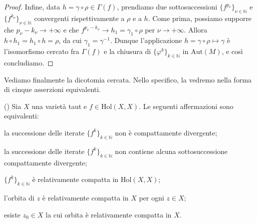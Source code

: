 \begin{proof}
    Infine, data $h=\gamma\circ\rho\in\Gamma(f)$, prendiamo due sottosuccessioni $\{f^{p_\nu}\}_{\nu\in\mathbb{N}}$ e $\{f^{k_\nu}\}_{\nu\in\mathbb{N}}$ convergenti rispettivamente a $\rho$ e a $h$. Come prima, possiamo supporre che $p_\nu-k_\nu \longrightarrow+\infty$ e che $f^{p_\nu-k_\nu} \longrightarrow h_1=\gamma_1\circ\rho$ per $\nu\longrightarrow+\infty$. Allora $h\circ h_1=h_1\circ h=\rho$, da cui $\gamma_1=\gamma^{-1}$. Dunque l'applicazione $h=\gamma\circ\rho\longmapsto\gamma$ è l'isomorfismo cercato fra $\Gamma(f)$ e la chiusura di $\{\varphi^k\}_{k\in\mathbb{N}}$ in $\text{Aut}(M)$, e così concludiamo.
\end{proof}

Vediamo finalmente la dicotomia cercata. Nello specifico, la vedremo nella forma di cinque asserzioni equivalenti.

\begin{thm} \label{dicotomia}
    (\cite[Theorem 1.1]{A2}) Sia $X$ una varietà taut e $f \in \text{Hol}(X,X)$. Le seguenti affermazioni sono equivalenti:
    \begin{nlist}
        \item la successione delle iterate $\{f^k\}_{k \in \mathbb{N}}$ non è compattamente divergente;
        \item la successione delle iterate $\{f^k\}_{k \in \mathbb{N}}$ non contiene alcuna sottosuccessione compattamente divergente;
        \item $\{f^k\}_{k \in \mathbb{N}}$ è relativamente compatta in $\text{Hol}(X,X)$;
        \item l'orbita di $z$ è relativamente compatta in $X$ per ogni $z \in X$;
        \item esiste $z_0 \in X$ la cui orbita è relativamente compatta in $X$.
    \end{nlist}
\end{thm}

